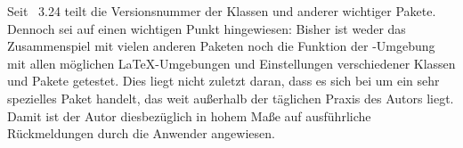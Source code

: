 Seit \KOMAScript~3.24 teilt  die Versionsnummer der Klassen
und anderer wichtiger Pakete. Dennoch sei auf einen wichtigen Punkt
hingewiesen: Bisher ist weder das Zusammenspiel mit vielen anderen Paketen
noch die Funktion der -Umgebung mit allen
möglichen \LaTeX-Umgebungen und Einstellungen verschiedener Klassen und Pakete
getestet. Dies liegt nicht zuletzt daran, dass es sich bei 
um ein sehr spezielles Paket handelt, das weit außerhalb der täglichen Praxis
des Autors liegt. Damit ist der Autor diesbezüglich in hohem Maße auf
ausführliche Rückmeldungen durch die Anwender angewiesen.%
\EndIndexGroup


